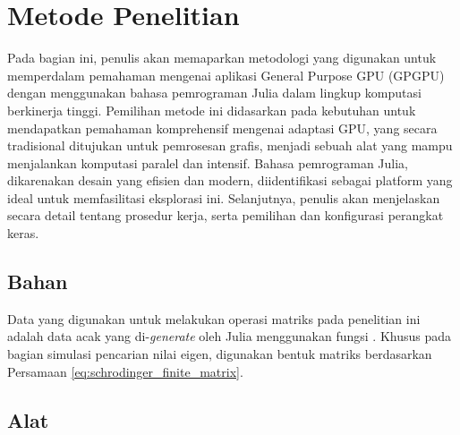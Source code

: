 \chapter{Metode Penelitian}


Pada bagian ini, penulis akan memaparkan metodologi yang digunakan untuk
memperdalam pemahaman mengenai aplikasi General Purpose GPU (GPGPU) dengan
menggunakan bahasa pemrograman Julia dalam lingkup komputasi berkinerja tinggi.
Pemilihan metode ini didasarkan pada kebutuhan untuk mendapatkan pemahaman
komprehensif mengenai adaptasi GPU, yang secara tradisional ditujukan untuk
pemrosesan grafis, menjadi sebuah alat yang mampu menjalankan komputasi paralel
dan intensif. Bahasa pemrograman Julia, dikarenakan desain yang efisien dan
modern, diidentifikasi sebagai platform yang ideal untuk memfasilitasi
eksplorasi ini. Selanjutnya, penulis akan menjelaskan secara detail tentang
prosedur kerja, serta pemilihan dan konfigurasi perangkat keras.

\section{Bahan}

Data yang digunakan untuk melakukan operasi matriks pada penelitian ini adalah
data acak yang di-\emph{generate} oleh Julia menggunakan fungsi . Khusus pada bagian simulasi pencarian nilai eigen, digunakan bentuk matriks berdasarkan Persamaan \ref{eq:schrodinger_finite_matrix}.

\section{Alat}

